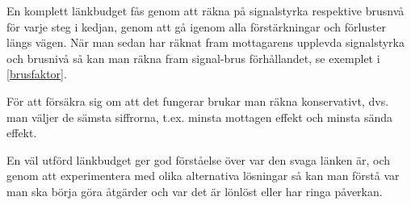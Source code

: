 En komplett länkbudget fås genom att räkna på signalstyrka respektive brusnvå
för varje steg i kedjan, genom att gå igenom alla förstärkningar och förluster
längs vägen.
När man sedan har räknat fram mottagarens upplevda signalstyrka och brusnivå så
kan man räkna fram signal-brus förhållandet, se exemplet i \ref{brusfaktor}.

För att försäkra sig om att det fungerar brukar man räkna konservativt, dvs.
man väljer de sämsta siffrorna, t.ex. minsta mottagen effekt och minsta sända
effekt.

En väl utförd länkbudget ger god förståelse över var den svaga länken är,
och genom att experimentera med olika alternativa lösningar så kan man
förstå var man ska börja göra åtgärder och var det är lönlöst eller har
ringa påverkan.
